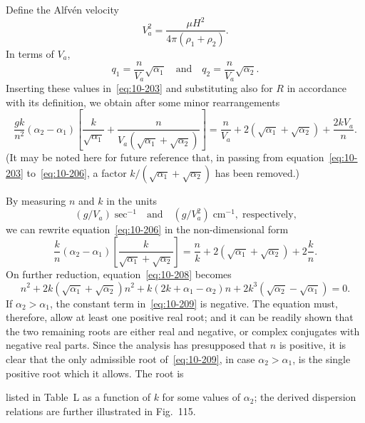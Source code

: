 Define the Alfv\'en velocity
\begin{equation}
\label{eq:10-204}
V_a^2 = \frac{\mu H^2}{4\pi(\rho_1+\rho_2)}.
\end{equation}
In terms of $V_a$,
\begin{equation}
\label{eq:10-205}
q_1 = \frac{n}{V_a}\sqrt{\alpha_1} \quad\text{and}\quad q_2 = \frac{n}{V_a}\sqrt{\alpha_2}.
\end{equation}
Inserting these values in~\eqref{eq:10-203} and substituting also for $R$ in accordance with its definition, we obtain after some minor rearrangements
\begin{equation}
\label{eq:10-206}
\frac{gk}{n^2}(\alpha_2-\alpha_1)\!\left[\frac{k}{\sqrt{\alpha_1}}+\frac{n}{V_a(\sqrt{\alpha_1}+\sqrt{\alpha_2})}\right] = \frac{n}{V_a}+2(\sqrt{\alpha_1}+\sqrt{\alpha_2})+\frac{2kV_a}{n}.
\end{equation}
(It may be noted here for future reference that, in passing from equation~\eqref{eq:10-203} to~\eqref{eq:10-206}, a factor $k/(\sqrt{\alpha_1}+\sqrt{\alpha_2})$ has been removed.)

By measuring $n$ and $k$ in the units
\begin{equation}
\label{eq:10-207}
(g/V_a)\;\text{sec}^{-1} \quad\text{and}\quad (g/V_a^2)\;\text{cm}^{-1},\;\text{respectively,}
\end{equation}
we can rewrite equation~\eqref{eq:10-206} in the non-dimensional form
\begin{equation}
\label{eq:10-208}
\frac{k}{n}(\alpha_2-\alpha_1)\!\left[\frac{k}{\sqrt{\alpha_1}+\sqrt{\alpha_2}}\right] = \frac{n}{k}+2(\sqrt{\alpha_1}+\sqrt{\alpha_2})+2\frac{k}{n}.
\end{equation}
On further reduction, equation~\eqref{eq:10-208} becomes
\begin{equation}
\label{eq:10-209}
n^2+2k(\sqrt{\alpha_1}+\sqrt{\alpha_2})n^2+k(2k+\alpha_1-\alpha_2)n+2k^3(\sqrt{\alpha_2}-\sqrt{\alpha_1}) = 0.
\end{equation}
If $\alpha_2 > \alpha_1$, the constant term in~\eqref{eq:10-209} is negative. The equation must, therefore, allow at least one positive real root; and it can be readily shown that the two remaining roots are either real and negative, or complex conjugates with negative real parts. Since the analysis has presupposed that $n$ is positive, it is clear that the only admissible root of~\eqref{eq:10-209}, in case $\alpha_2 > \alpha_1$, is the single positive root which it allows. The root is

listed in Table~L as a function of $k$ for some values of $\alpha_2$; the derived dispersion relations are further illustrated in Fig.~115.

